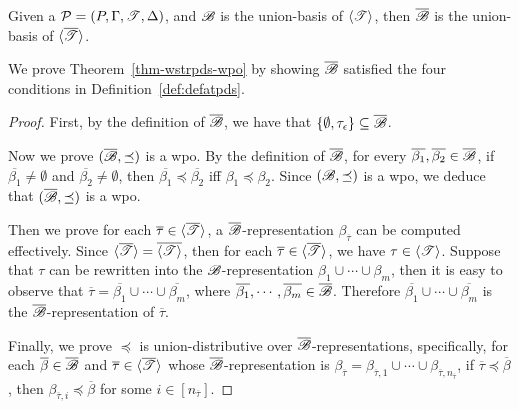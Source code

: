 \begin{theorem}\label{thm-wstrpds-wpo}
	Given a {\WOTrPDS} ${\mathcal{P} } = (P, \Gamma, {\mathscr{T} }, \Delta)$, and ${\mathscr{B} }$ is the union-basis of $\langle {\mathscr{T} } \rangle$, then $\overline{{\mathscr{B} }}$ is the union-basis of $\langle \overline{{\mathscr{T} }}\rangle$.
\end{theorem}
We prove Theorem~\ref{thm-wstrpds-wpo} by showing $\overline{{\mathscr{B} }}$ satisfied the four conditions in Definition~\ref{def:defatpds}.
\begin{proof}
	First, by the definition of $\overline{{\mathscr{B} }}$, we have that $\{\emptyset, \tau_{\epsilon}\}\subseteq \overline{{\mathscr{B} }}$.

	Now we prove $(\overline{{\mathscr{B} }}, \preceq)$ is a wpo. By the definition of $\overline{{\mathscr{B} }}$, for every $\overline{\beta_1},\overline{\beta_2}\in\overline{{\mathscr{B} }}$, if $\overline{\beta_1}\neq\emptyset$ and $\overline{\beta_2}\neq \emptyset$, then $\overline{\beta_1}\preceq\overline{\beta_2}$ iff $\beta_1\preceq\beta_2$. Since $({\mathscr{B} }, \preceq)$ is a wpo, we deduce that $(\overline{{\mathscr{B} }}, \preceq)$ is a wpo.

	Then we prove for each $\overline{\tau}\in\langle\overline{{\mathscr{T} }}\rangle$, a $\overline{{\mathscr{B} }}$-representation $\beta_{\overline{\tau}}$ can be computed effectively.
	Since $\langle\overline{{\mathscr{T} }}\rangle = \overline{\langle {\mathscr{T} } \rangle}$, then for each $\overline{\tau}\in\langle\overline{{\mathscr{T} }}\rangle$, we have $\tau \in \langle {\mathscr{T} } \rangle$. 
	Suppose that $\tau$ can be rewritten into the ${\mathscr{B} }$-representation $\beta_1\cup\cdots\cup\beta_m$, then it is easy to observe that $\overline{\tau} = \overline{\beta_1}\cup\cdots\cup\overline{\beta_m}$, where $\overline{\beta_1},\cdots,\overline{\beta_m} \in \overline{{\mathscr{B} }}$. Therefore $\overline{\beta_1}\cup\cdots\cup\overline{\beta_m}$ is the $\overline{{\mathscr{B} }}$-representation of $\overline{\tau}$.

	Finally, we prove $\preceq$ is union-distributive over $\overline{{\mathscr{B} }}$-representations, specifically, for each $\overline{\beta} \in \overline{{\mathscr{B} }}$ and $\overline{\tau} \in \langle \overline{{\mathscr{T} }} \rangle$ whose $\overline{{\mathscr{B} }}$-representation is $\beta_{\overline{\tau}}=\beta_{\overline{\tau}, 1} \cup \cdots \cup \beta_{\overline{\tau}, n_{\overline{\tau}}}$, if $\overline{\tau} \preceq \overline{\beta}$, then $ \beta_{\overline{\tau}, i} \preceq \overline{\beta}$ for some $i \in [n_{\overline{\tau}}]$.


\end{proof}
